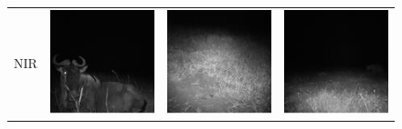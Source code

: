 \begin{figure}
    \centering
    \begin{tabularx}{.6\textwidth}{>{\small}m{.03\linewidth} Y Y Y}
        \begin{sideways}NIR\end{sideways}       & \includegraphics{gfx/conditional-diffusion-sampling-hallucinations-qual/nir_S2_C07_R3_PICT0462.jpg}       & \includegraphics{gfx/conditional-diffusion-sampling-hallucinations-qual/nir_S2_G13_R1_PICT0332.jpg}       & \includegraphics{gfx/conditional-diffusion-sampling-hallucinations-qual/nir_S2_T11_R2_PICT0208.jpg}       \\

\end{tabularx}
\end{figure}
